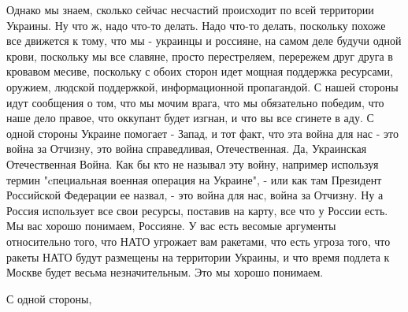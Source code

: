Однако мы знаем, сколько сейчас несчастий происходит по всей территории
Украины. Ну что ж, надо что-то делать. Надо что-то делать, поскольку похоже все
движется к тому, что мы - украинцы и россияне, на самом деле будучи одной
крови, поскольку мы все славяне, просто перестреляем, перережем друг друга в
кровавом месиве, поскольку с обоих сторон идет мощная поддержка ресурсами,
оружием, людской поддержкой, информационной пропагандой. С нашей стороны идут
сообщения о том, что мы мочим врага, что мы обязательно победим, что наше дело
правое, что оккупант будет изгнан, и что вы все сгинете в аду. С одной стороны
Украине помогает - Запад, и тот факт, что эта война для нас - это война за
Отчизну, это война справедливая, Отечественная. Да, Украинская Отечественная
Война. Как бы кто не называл эту войну, например используя термин "cпециальная
военная операция на Украине", - или как там Президент Российской Федерации ее
назвал, - это война для нас, война за Отчизну. Ну а Россия использует все свои
ресурсы, поставив на карту, все что у России есть.  Мы вас хорошо понимаем,
Россияне. У вас есть весомые аргументы относительно того, что НАТО угрожает вам
ракетами, что есть угроза того, что ракеты НАТО будут размещены на территории
Украины, и что время подлета к Москве будет весьма незначительным. Это мы
хорошо понимаем. 

С одной стороны,
